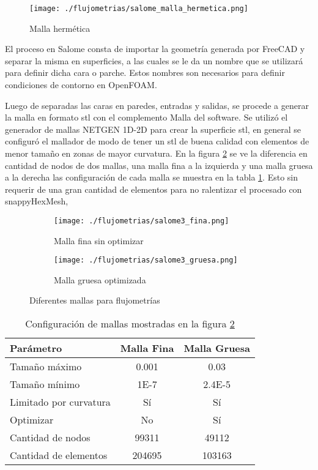 \begin{figure}
    \centering
    \texttt{[image: ./flujometrias/salome\_malla\_hermetica.png]}
    \caption{Malla hermética}\label{fig:salome_malla_hermetica}
\end{figure}

El proceso en Salome consta de importar la geometría generada por FreeCAD y
separar la misma en superficies, a las cuales se le da un nombre que se
utilizará para definir dicha cara o parche.
%
Estos nombres son necesarios para definir condiciones de contorno en OpenFOAM.

Luego de separadas las caras en paredes, entradas y salidas, se procede a
generar la malla en formato stl con el complemento Malla del software.
%
Se utilizó el generador de mallas NETGEN 1D-2D para crear la superficie stl, en
general se configuró el mallador de modo de tener un stl de buena calidad con
elementos de menor tamaño en zonas de mayor curvatura.
%
En la figura \ref{fig:salome_fina_gruesa} se ve la diferencia en cantidad de
nodos de dos mallas, una malla fina a la izquierda y una malla gruesa a la
derecha las configuración de cada malla se muestra en la tabla \ref{tab:salome_fina_gruesa}.
%
Esto sin requerir de una gran cantidad de elementos para no ralentizar el
procesado con snappyHexMesh,

\begin{figure}[t!]
    \centering
    \begin{subfigure}[t]{0.5\textwidth}
        \centering
        \texttt{[image: ./flujometrias/salome3\_fina.png]}
        \caption{Malla fina sin optimizar}
    \end{subfigure}%
    \begin{subfigure}[t]{0.5\textwidth}
        \centering
        \texttt{[image: ./flujometrias/salome3\_gruesa.png]}
        \caption{Malla gruesa optimizada}
    \end{subfigure}
    \caption{Diferentes mallas para flujometrías}\label{fig:salome_fina_gruesa}
\end{figure}

\begin{table}
    \centering
    \begin{tabular}{lcc} \toprule
        Parámetro                & Malla Fina    & Malla Gruesa \\ \midrule
        Tamaño máximo            & 0.001         & 0.03 \\
        Tamaño mínimo            & 1E-7          & 2.4E-5 \\
        Limitado por curvatura   & Sí            & Sí \\
        Optimizar                & No            & Sí \\
        Cantidad de nodos        & 99311         & 49112 \\
        Cantidad de elementos    & 204695        & 103163 \\ \bottomrule
    \end{tabular}
    \caption{Configuración de mallas mostradas en la figura \ref{fig:salome_fina_gruesa}}
    \label{tab:salome_fina_gruesa}
\end{table}

